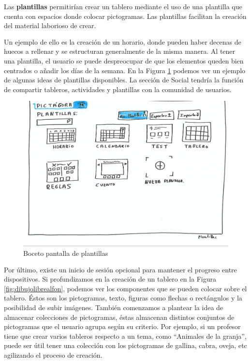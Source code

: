 Las \textbf{plantillas} permitirían crear un tablero mediante el uso de una plantilla que cuenta con espacios donde colocar pictogramas. Las plantillas facilitan la creación del material laborioso de crear.

Un ejemplo de ello es la creación de un horario, donde pueden haber decenas de huecos a rellenar y se estructuran generalmente de la misma manera. Al tener una plantilla, el usuario se puede despreocupar de que los elementos queden bien centrados o añadir los días de la semana. En la Figura \ref{fig:inicioalfonso} podemos ver un ejemplo de algunas ideas de plantillas disponibles. La sección de Social tendría la función de compartir tableros, actividades y plantillas con la comunidad de usuarios.

\begin{figure}[h!]
	\centering
	\includegraphics[width=0.7\linewidth]{Imagenes/Bitmap/inicioAlfonso}
	\caption{Boceto pantalla de plantillas}
	\label{fig:inicioalfonso}
\end{figure}


Por último, existe un inicio de sesión opcional para mantener el progreso entre dispositivos. Si profundizamos en la creación de un tablero en la Figura \ref{fig:dibujolibrealfon}, podemos ver los componentes que se pueden colocar sobre el tablero. Éstos son los pictogramas, texto, figuras como flechas o rectángulos y la posibilidad de subir imágenes. También comenzamos a plantear la idea de almacenar colecciones de pictogramas, éstas almacenan distintos conjuntos de pictogramas que el usuario agrupa según su criterio. Por ejemplo, si un profesor tiene que crear varios tableros respecto a un tema, como “Animales de la granja”, puede ser útil tener una colección con los pictogramas de gallina, cabra, oveja, etc agilizando el proceso de creación.

